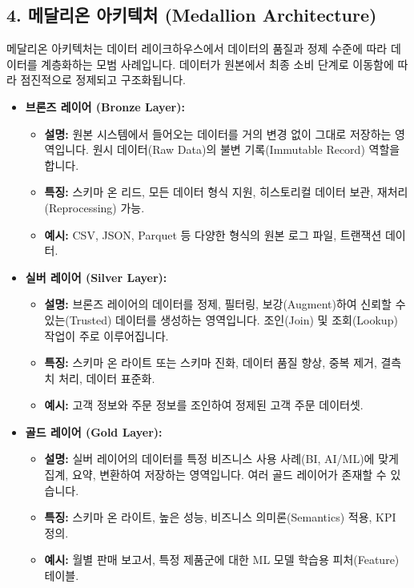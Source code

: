\documentclass[11pt,a4paper]{article}
\begin{document}
\subsection*{4. 메달리온 아키텍처 (Medallion Architecture)}

메달리온 아키텍처는 데이터 레이크하우스에서 데이터의 품질과 정제 수준에 따라 데이터를 계층화하는 모범 사례입니다. 데이터가 원본에서 최종 소비 단계로 이동함에 따라 점진적으로 정제되고 구조화됩니다.

\begin{tcolorbox}[title=\textbf{메달리온 아키텍처의 3단계}, colback=yellow!5!white, colframe=yellow!75!black, sharp corners, boxrule=0.8pt]
\begin{itemize}
    \item \textbf{브론즈 레이어 (Bronze Layer):}
    \begin{itemize}
        \item \textbf{설명:} 원본 시스템에서 들어오는 데이터를 거의 변경 없이 그대로 저장하는 영역입니다. 원시 데이터(Raw Data)의 불변 기록(Immutable Record) 역할을 합니다.
        \item \textbf{특징:} 스키마 온 리드, 모든 데이터 형식 지원, 히스토리컬 데이터 보관, 재처리(Reprocessing) 가능.
        \item \textbf{예시:} CSV, JSON, Parquet 등 다양한 형식의 원본 로그 파일, 트랜잭션 데이터.
    \end{itemize}
    \item \textbf{실버 레이어 (Silver Layer):}
    \begin{itemize}
        \item \textbf{설명:} 브론즈 레이어의 데이터를 정제, 필터링, 보강(Augment)하여 신뢰할 수 있는(Trusted) 데이터를 생성하는 영역입니다. 조인(Join) 및 조회(Lookup) 작업이 주로 이루어집니다.
        \item \textbf{특징:} 스키마 온 라이트 또는 스키마 진화, 데이터 품질 향상, 중복 제거, 결측치 처리, 데이터 표준화.
        \item \textbf{예시:} 고객 정보와 주문 정보를 조인하여 정제된 고객 주문 데이터셋.
    \end{itemize}
    \item \textbf{골드 레이어 (Gold Layer):}
    \begin{itemize}
        \item \textbf{설명:} 실버 레이어의 데이터를 특정 비즈니스 사용 사례(BI, AI/ML)에 맞게 집계, 요약, 변환하여 저장하는 영역입니다. 여러 골드 레이어가 존재할 수 있습니다.
        \item \textbf{특징:} 스키마 온 라이트, 높은 성능, 비즈니스 의미론(Semantics) 적용, KPI 정의.
        \item \textbf{예시:} 월별 판매 보고서, 특정 제품군에 대한 ML 모델 학습용 피처(Feature) 테이블.
    \end{itemize}
\end{itemize}
\end{tcolorbox}
\end{document}
